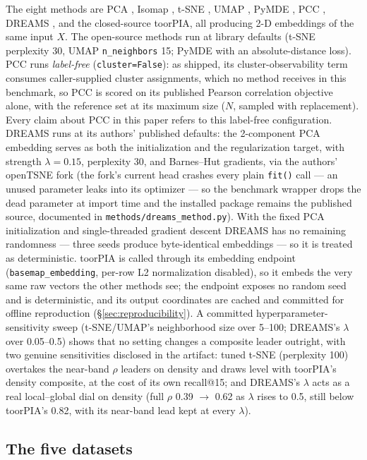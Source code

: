 \documentclass[11pt]{article}
\begin{document}
The eight methods are PCA \cite{hotelling1933pca}, Isomap
\cite{tenenbaum2000isomap}, t-SNE \cite{vandermaaten2008tsne}, UMAP
\cite{mcinnes2018umap}, PyMDE \cite{agrawal2021pymde}, PCC \cite{pcc2025},
DREAMS \cite{kury2026dreams},
and the closed-source toorPIA, all producing 2-D embeddings of the same
input $X$. The open-source methods run at library defaults (t-SNE
perplexity 30, UMAP \texttt{n\_neighbors} 15; PyMDE with an
absolute-distance loss). PCC runs \emph{label-free}
(\texttt{cluster=False}): as shipped, its cluster-observability term
consumes caller-supplied cluster assignments, which no method receives in
this benchmark, so PCC is scored on its published Pearson correlation
objective alone, with the reference set at its maximum size ($N$, sampled
with replacement). Every claim about PCC in this paper refers to this
label-free configuration. DREAMS runs at its authors' published defaults:
the 2-component PCA embedding serves as both the initialization and the
regularization target, with strength $\lambda{=}0.15$, perplexity 30, and
Barnes--Hut gradients, via the authors' openTSNE fork (the fork's current
head crashes every plain \texttt{fit()} call --- an unused parameter leaks
into its optimizer --- so the benchmark wrapper drops the dead parameter at
import time and the installed package remains the published source,
documented in \texttt{methods/dreams\_method.py}). With the fixed PCA
initialization and single-threaded gradient descent DREAMS has no remaining
randomness --- three seeds produce byte-identical embeddings --- so it is
treated as deterministic. toorPIA is called through its embedding endpoint
(\texttt{basemap\_embedding}, per-row L2 normalization disabled), so it
embeds the very same raw vectors the other methods see; the endpoint exposes
no random seed and is deterministic, and its output coordinates are cached
and committed for offline reproduction (\S\ref{sec:reproducibility}). A
committed hyperparameter-sensitivity sweep (t-SNE/UMAP's neighborhood size
over 5--100; DREAMS's $\lambda$ over 0.05--0.5) shows that no setting
changes a composite leader outright, with two genuine sensitivities
disclosed in the artifact: tuned t-SNE (perplexity 100) overtakes the
near-band $\rho$ leaders on density and draws level with toorPIA's density
composite, at the cost of its own recall@15; and DREAMS's $\lambda$ acts as
a real local--global dial on density (full $\rho$ 0.39 $\to$ 0.62 as
$\lambda$ rises to 0.5, still below toorPIA's 0.82, with its near-band lead
kept at every $\lambda$).

\subsection{The five datasets}
\label{sec:fivedatasets}
\end{document}
